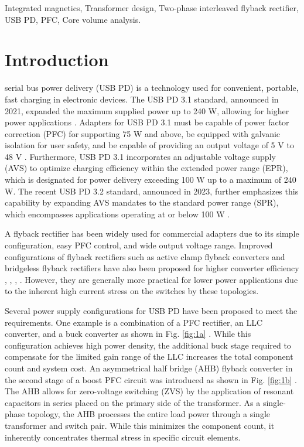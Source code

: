\documentclass[lettersize,journal]{IEEEtran}
\begin{document}
\begin{IEEEkeywords}
Integrated magnetics, Transformer design, Two-phase interleaved flyback rectifier, USB PD, PFC, Core volume analysis.
\end{IEEEkeywords}

\section{Introduction}
 serial bus power delivery (USB PD) is a technology used for convenient, portable, fast charging in electronic devices. The USB PD 3.1 standard, announced in 2021, expanded the maximum supplied power up to 240 W, allowing for higher power applications \cite{ref1}. Adapters for USB PD 3.1 must be capable of power factor correction (PFC) for supporting 75 W and above, be equipped with galvanic isolation for user safety, and be capable of providing an output voltage of 5 V to 48 V \cite{ref2}.  Furthermore, USB PD 3.1 incorporates an adjustable voltage supply (AVS) to optimize charging efficiency within the extended power range (EPR), which is designated for power delivery exceeding 100 W up to a maximum of 240 W. The recent USB PD 3.2 standard, announced in 2023, further emphasizes this capability by expanding AVS mandates to the standard power range (SPR), which encompasses applications operating at or below 100 W \cite{ref2.2}.

A flyback rectifier has been widely used for commercial adapters due to its simple configuration, easy PFC control, and wide output voltage range. Improved configurations of flyback rectifiers such as active clamp flyback converters \cite{ref6, ref7} and bridgeless flyback rectifiers have also been proposed for higher converter efficiency \cite{ref8}, \cite{ref9}, \cite{ref10}, \cite{ref11}. However, they are generally more practical for lower power applications due to the inherent high current stress on the switches by these topologies. 

Several power supply configurations for USB PD have been proposed to meet the requirements. One example is a combination of a PFC rectifier, an LLC converter, and a buck converter as shown in Fig. \ref{fig:1a} \cite{ref3, ref4}. While this configuration achieves high power density, the additional buck stage required to compensate for the limited gain range of the LLC increases the total component count and system cost. An asymmetrical half bridge (AHB) flyback converter in the second stage of a boost PFC circuit was introduced as shown in Fig. \ref{fig:1b} \cite{ref5}. The AHB allows for zero-voltage switching (ZVS) by the application of resonant capacitors in series placed on the primary side of the transformer. As a single-phase topology, the AHB processes the entire load power through a single transformer and switch pair. While this minimizes the component count, it inherently concentrates thermal stress in specific circuit elements.
\end{document}
